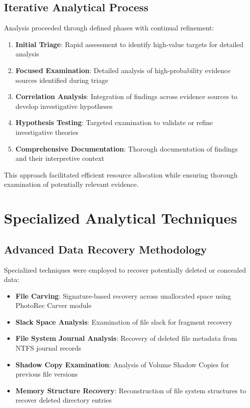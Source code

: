 \subsection{Iterative Analytical Process}
Analysis proceeded through defined phases with continual refinement:

\begin{enumerate}
    \item \textbf{Initial Triage}: Rapid assessment to identify high-value targets for detailed analysis
    
    \item \textbf{Focused Examination}: Detailed analysis of high-probability evidence sources identified during triage
    
    \item \textbf{Correlation Analysis}: Integration of findings across evidence sources to develop investigative hypotheses
    
    \item \textbf{Hypothesis Testing}: Targeted examination to validate or refine investigative theories
    
    \item \textbf{Comprehensive Documentation}: Thorough documentation of findings and their interpretive context
\end{enumerate}

This approach facilitated efficient resource allocation while ensuring thorough examination of potentially relevant evidence.

\section{Specialized Analytical Techniques}

\subsection{Advanced Data Recovery Methodology}
Specialized techniques were employed to recover potentially deleted or concealed data:

\begin{itemize}
    \item \textbf{File Carving}: Signature-based recovery across unallocated space using PhotoRec Carver module
    
    \item \textbf{Slack Space Analysis}: Examination of file slack for fragment recovery
    
    \item \textbf{File System Journal Analysis}: Recovery of deleted file metadata from NTFS journal records
    
    \item \textbf{Shadow Copy Examination}: Analysis of Volume Shadow Copies for previous file versions
    
    \item \textbf{Memory Structure Recovery}: Reconstruction of file system structures to recover deleted directory entries
\end{itemize}

